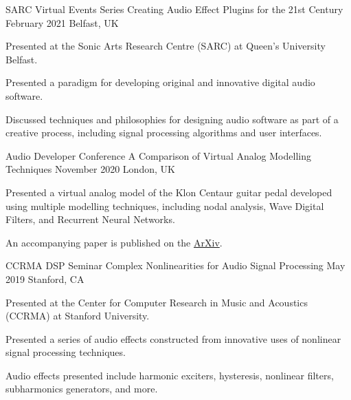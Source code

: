 

\begin{cventries}

  \cventry
    {SARC Virtual Events Series} %
    {Creating Audio Effect Plugins for the 21st Century} %
    {February 2021} %
    {Belfast, UK} %
    {
      \begin{cvitems} %
        \item {Presented at the Sonic Arts Research Centre (SARC) at Queen's University Belfast.}
        \item {Presented a paradigm for developing original and innovative digital audio software.}
        \item {Discussed techniques and philosophies for designing audio software as part of a creative process,
               including signal processing algorithms and user interfaces.}
      \end{cvitems}
    }

  \cventry
    {Audio Developer Conference} %
    {A Comparison of Virtual Analog Modelling Techniques} %
    {November 2020} %
    {London, UK} %
    {
      \begin{cvitems} %
        \item {Presented a virtual analog model of the Klon Centaur guitar pedal
               developed using multiple modelling techniques, including nodal
               analysis, Wave Digital Filters, and Recurrent Neural Networks.}
        \item {An accompanying paper is published on the \href{https://arxiv.org/abs/2009.02833}{ArXiv}.}
      \end{cvitems}
    }

  \cventry
    {CCRMA DSP Seminar} %
    {Complex Nonlinearities for Audio Signal Processing} %
    {May 2019} %
    {Stanford, CA} %
    {
      \begin{cvitems} %
        \item {Presented at the Center for Computer Research in Music and Acoustics (CCRMA) at Stanford University.}
        \item {Presented a series of audio effects constructed from
               innovative uses of nonlinear signal processing techniques.}
        \item {Audio effects presented include harmonic exciters, hysteresis,
               nonlinear filters, subharmonics generators, and more.}
      \end{cvitems}
    }


\end{cventries}

